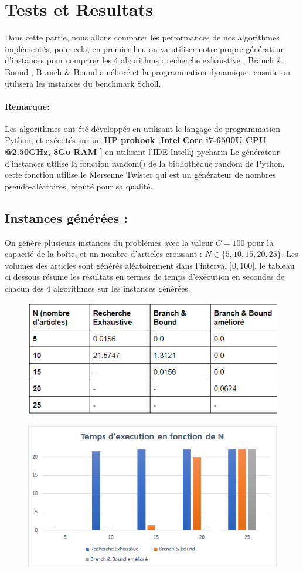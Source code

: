 \documentclass[12pt]{article}
\begin{document}
\section{Tests et Resultats}
Dans cette partie, nous allons comparer les performances de nos algorithmes implémentés, pour cela, en premier lieu on va utiliser notre propre générateur d’instances pour comparer les 4 algorithms : recherche exhaustive , Branch \& Bound , Branch \& Bound amélioré et la programmation dynamique. ensuite on utilisera les instances du benchmark Scholl. 
\paragraph*{Remarque: } Les algorithmes ont été développés en utilisant le langage de programmation Python, et exécutés sur un \textbf{HP probook [Intel Core i7-6500U CPU @2.50GHz, 8Go RAM ]} en utilisant l'IDE Intellij pycharm
Le générateur d’instances utilise la fonction random() de la bibliothèque random de Python, cette fonction utilise le Mersenne Twister qui est un générateur de nombres pseudo-aléatoires, réputé pour sa qualité.
\subsection{Instances générées : }
On génère plusieurs instances du problèmes avec la valeur \(C=100\) pour la capacité de la boîte, et un nombre d’articles croissant : \( N \in \{5,10,15,20,25\}\). Les volumes des articles sont générés aléatoirement dans l’interval \(]0,100]\). le tableau ci dessous résume les résultats en termes de temps d'exécution en secondes de chacun des 4 algorithmes sur les instances générées. 
\begin{figure}[H]
    \includegraphics[width=13.5cm]{../figures/tab1.png}
\end{figure}
\begin{figure}[H]
    \includegraphics[width=13.5cm]{../figures/graph1.png}
\end{figure}
\end{document}
